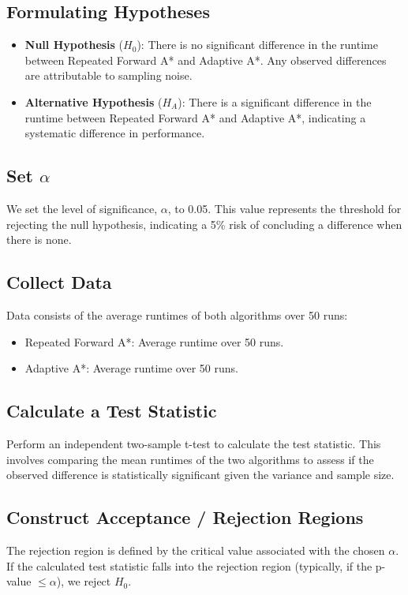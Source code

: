 \documentclass{article}
\begin{document}
\subsection{Formulating Hypotheses}

\begin{itemize}
    \item \textbf{Null Hypothesis} (\(H_0\)): There is no significant difference in the runtime between Repeated Forward A* and Adaptive A*. Any observed differences are attributable to sampling noise.
    \item \textbf{Alternative Hypothesis} (\(H_A\)): There is a significant difference in the runtime between Repeated Forward A* and Adaptive A*, indicating a systematic difference in performance.
\end{itemize}

\subsection{Set \(\alpha\)}
We set the level of significance, \(\alpha\), to 0.05. This value represents the threshold for rejecting the null hypothesis, indicating a 5\% risk of concluding a difference when there is none.

\subsection{Collect Data}
Data consists of the average runtimes of both algorithms over 50 runs:
\begin{itemize}
    \item Repeated Forward A*: Average runtime over 50 runs.
    \item Adaptive A*: Average runtime over 50 runs.
\end{itemize}

\subsection{Calculate a Test Statistic}
Perform an independent two-sample t-test to calculate the test statistic. This involves comparing the mean runtimes of the two algorithms to assess if the observed difference is statistically significant given the variance and sample size.

\subsection{Construct Acceptance / Rejection Regions}
The rejection region is defined by the critical value associated with the chosen \(\alpha\). If the calculated test statistic falls into the rejection region (typically, if the p-value \(\leq \alpha\)), we reject \(H_0\).
\end{document}
